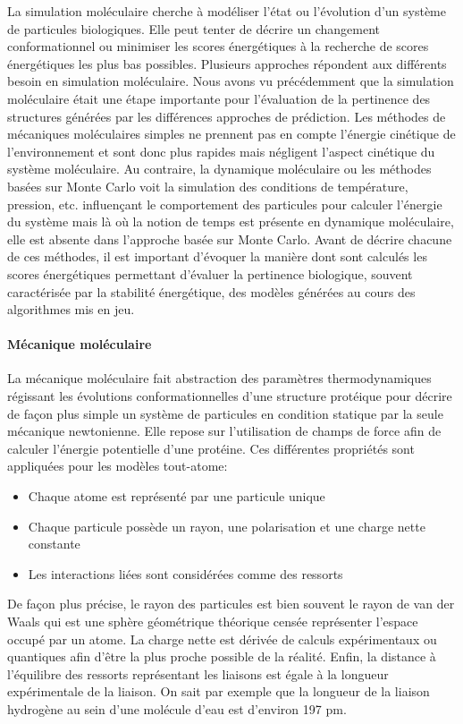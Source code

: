La simulation moléculaire cherche à modéliser l'état ou l'évolution d'un système de particules biologiques. Elle peut tenter de décrire un changement conformationnel ou minimiser les scores énergétiques à la recherche de scores énergétiques les plus bas possibles. Plusieurs approches répondent aux différents besoin en simulation moléculaire. Nous avons vu précédemment que la simulation moléculaire était une étape importante pour l'évaluation de la pertinence des structures générées par les différences approches de prédiction. 
Les méthodes de mécaniques moléculaires simples ne prennent pas en compte l'énergie cinétique de l'environnement et sont donc plus rapides mais négligent l'aspect cinétique du système moléculaire. Au contraire, la dynamique moléculaire ou les méthodes basées sur Monte Carlo voit la simulation des conditions de température, pression, etc. influençant le comportement des particules pour calculer l'énergie du système mais là où la notion de temps est présente en dynamique moléculaire, elle est absente dans l'approche basée sur Monte Carlo.
Avant de décrire chacune de ces méthodes, il est important d'évoquer la manière dont sont calculés les scores énergétiques permettant d'évaluer la pertinence biologique, souvent caractérisée par la stabilité énergétique, des modèles générées au cours des algorithmes mis en jeu.

\paragraph{Mécanique moléculaire}

La mécanique moléculaire fait abstraction des paramètres thermodynamiques régissant les évolutions conformationnelles d'une structure protéique pour décrire de façon plus simple un système de particules en condition statique par la seule mécanique newtonienne. Elle repose sur l'utilisation de champs de force afin de calculer l'énergie potentielle d'une protéine. Ces différentes propriétés sont appliquées pour les modèles tout-atome:

\begin{itemize}
	\item Chaque atome est représenté par une particule unique
	\item Chaque particule possède un rayon, une polarisation et une charge nette constante
	\item Les interactions liées sont considérées comme des ressorts 
\end{itemize}

De façon plus précise, le rayon des particules est bien souvent le rayon de van der Waals qui est une sphère géométrique théorique censée représenter l'espace occupé par un atome. La charge nette est dérivée de calculs expérimentaux ou quantiques afin d'être la plus proche possible de la réalité. Enfin, la distance à l'équilibre des ressorts représentant les liaisons est égale à la longueur expérimentale de la liaison. On sait par exemple que la longueur de la liaison hydrogène au sein d'une molécule d'eau est d'environ 197 pm.

